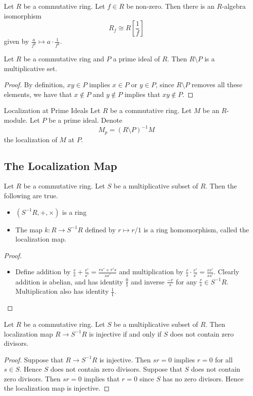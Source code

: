 \documentclass[a4paper]{article}
\begin{document}
\begin{lmm}{}{} Let $R$ be a commutative ring. Let $f\in R$ be non-zero. Then there is an $R$-algebra isomorphism $$R_f\cong R\left[\frac{1}{f}\right]$$ given by $\frac{a}{f^k}\mapsto a\cdot\frac{1}{f^k}$. 
\end{lmm}

\begin{lmm}{}{} Let $R$ be a commutative ring and $P$ a prime ideal of $R$. Then $R\setminus P$ is a multiplicative set. 
\begin{proof}
By definition, $xy\in P$ implies $x\in P$ or $y\in P$, since $R\setminus P$ removes all these elements, we have that $x\notin P$ and $y\notin P$ implies that $xy\notin P$. 
\end{proof}
\end{lmm}

\begin{defn}{Localization at Prime Ideals}{} Let $R$ be a commutative ring. Let $M$ be an $R$-module. Let $P$ be a prime ideal. Denote $$M_p=(R\setminus P)^{-1}M$$ the localization of $M$ at $P$. 
\end{defn}
\subsection{The Localization Map}
\begin{prp}{}{} Let $R$ be a commutative ring. Let $S$ be a multiplicative subset of $R$. Then the following are true. 
\begin{itemize}
\item $(S^{-1}R,+,\times)$ is a ring
\item The map $k:R\to S^{-1}R$ defined by $r\mapsto r/1$ is a ring homomorphism, called the localization map. 
\end{itemize}
\begin{proof}~\\
\begin{itemize}
\item Define addition by $\frac{r}{s}+\frac{r'}{s'}=\frac{rs'+r's}{ss'}$ and multiplication by $\frac{r}{s}\cdot\frac{r'}{s'}=\frac{rr'}{ss'}$. Clearly addition is abelian, and has identity $\frac{0}{1}$ and inverse $\frac{-r}{s}$ for any $\frac{r}{s}\in S^{-1}R$. Multiplication also has identity $\frac{1}{1}$. 
\end{itemize}
\end{proof}
\end{prp}

\begin{lmm}{}{} Let $R$ be a commutative ring. Let $S$ be a multiplicative subset of $R$. Then localization map $R\to S^{-1}R$ is injective if and only if $S$ does not contain zero divisors. 
\begin{proof}
Suppose that $R\to S^{-1}R$ is injective. Then $sr=0$ implies $r=0$ for all $s\in S$. Hence $S$ does not contain zero divisors. Suppose that $S$ does not contain zero divisors. Then $sr=0$ implies that $r=0$ since $S$ has no zero divisors. Hence the localization map is injective. 
\end{proof}
\end{lmm}
\end{document}
